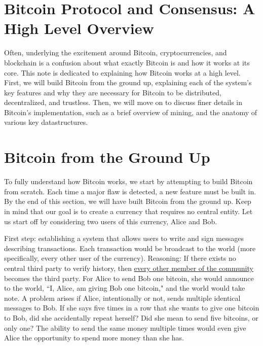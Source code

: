 \documentclass[11pt]{article}
\begin{document}
    \thispagestyle{firstpage}
    \vspace*{2\baselineskip}
    \section*{Bitcoin Protocol and Consensus: A High Level Overview}
    
    Often, underlying the excitement around Bitcoin, cryptocurrencies, and blockchain is a confusion about what exactly Bitcoin is and how it works at its core. This note is dedicated to explaining how Bitcoin works at a high level. First, we will build Bitcoin from the ground up, explaining each of the system's key features and why they are necessary for Bitcoin to be distributed, decentralized, and trustless. Then, we will move on to discuss finer details in Bitcoin's implementation, such as a brief overview of mining, and the anatomy of various key datastructures.
    
    \section*{Bitcoin from the Ground Up}
    
    To fully understand how Bitcoin works, we start by attempting to build Bitcoin from scratch. Each time a major flaw is detected, a new feature must be built in. By the end of this section, we will have built Bitcoin from the ground up. Keep in mind that our goal is to create a currency that requires no central entity. Let us start off by considering two users of this currency, Alice and Bob.
    
    First step: establishing a system that allows users to write and sign messages describing transactions. Each transaction would be broadcast to the world (more specifically, every other user of the currency). Reasoning: If there exists no central third party to verify history, then \underline{every other member of the community} becomes the third party. For Alice to send Bob one bitcoin, she would announce to the world, ``I, Alice, am giving Bob one bitcoin," and the world would take note. A problem arises if Alice, intentionally or not, sends multiple identical messages to Bob. If she says five times in a row that she wants to give one bitcoin to Bob, did she accidentally repeat herself? Did she mean to send five bitcoins, or only one? The ability to send the same money multiple times would even give Alice the opportunity to spend more money than she has.
    
\end{document}
